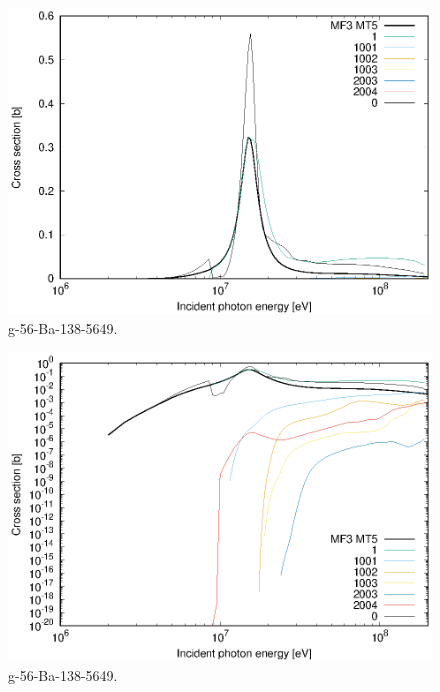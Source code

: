 \begin{figure}
 \includegraphics[width=\linewidth]{eps/g_56-Ba-138_5649.eps}
  \caption{g-56-Ba-138-5649.}
\end{figure}
\begin{figure}
 \includegraphics[width=\linewidth]{eps-log/g_56-Ba-138_5649.eps}
 \caption{g-56-Ba-138-5649.}
\end{figure}
\newpage \clearpage

